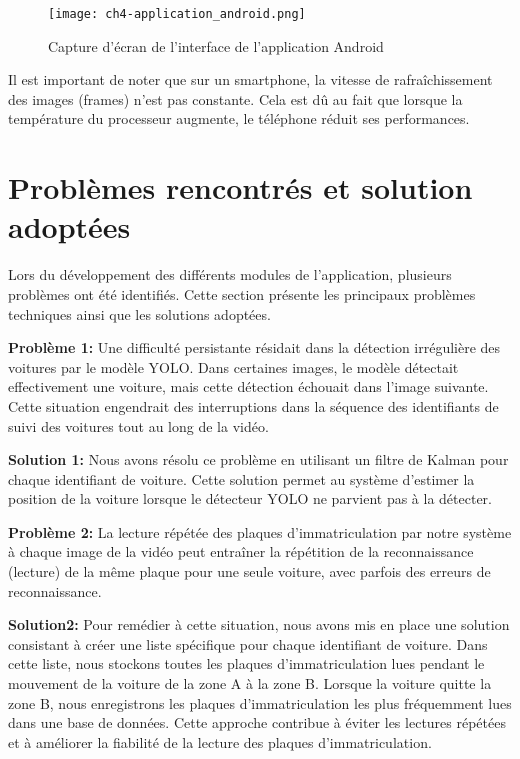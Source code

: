 \begin{figure}[H]
	\centering
	\texttt{[image: ch4-application\_android.png]}
	\caption{Capture d'écran de l'interface de l'application Android}
    \label{fig:ch4-application_android}
\end{figure}

Il est important de noter que sur un smartphone, la vitesse de rafraîchissement des images (frames) n'est pas constante. Cela est dû au fait que lorsque la température du processeur augmente, le téléphone réduit ses performances.

\section{Problèmes rencontrés et solution adoptées}

Lors du développement des différents modules de l'application, plusieurs problèmes ont été identifiés. Cette section présente les principaux problèmes techniques ainsi que les solutions adoptées.

\textbf{Problème 1:} Une difficulté persistante résidait dans la détection irrégulière des voitures par le modèle YOLO. Dans certaines images, le modèle détectait effectivement une voiture, mais cette détection échouait dans l'image suivante. Cette situation engendrait des interruptions dans la séquence des identifiants de suivi des voitures tout au long de la vidéo.

\textbf{Solution 1:}  Nous avons résolu ce problème en utilisant un filtre de Kalman pour chaque identifiant de voiture. Cette solution permet au système d'estimer la position de la voiture lorsque le détecteur YOLO ne parvient pas à la détecter.

\textbf{Problème 2:}  La lecture répétée des plaques d'immatriculation par notre système à chaque image de la vidéo peut entraîner la répétition de la reconnaissance (lecture) de la même plaque pour une seule voiture, avec parfois des erreurs de reconnaissance.

\textbf{Solution2: }  Pour remédier à cette situation, nous avons mis en place une solution consistant à créer une liste spécifique pour chaque identifiant de voiture. Dans cette liste, nous stockons toutes les plaques d'immatriculation lues pendant le mouvement de la voiture de la zone A à la zone B. Lorsque la voiture quitte la zone B, nous enregistrons les plaques d'immatriculation les plus fréquemment lues dans une base de données. Cette approche contribue à éviter les lectures répétées et à améliorer la fiabilité de la lecture des plaques d'immatriculation.

